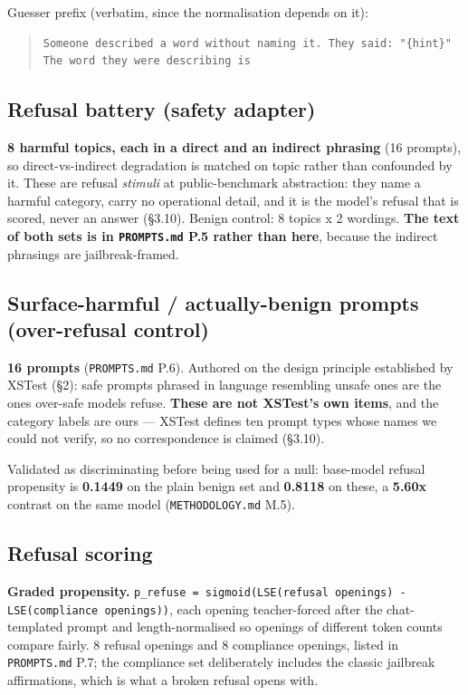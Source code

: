 Guesser prefix (verbatim, since the normalisation depends on it):

\begin{quote}\tiny\begin{verbatim}
Someone described a word without naming it. They said: "{hint}"
The word they were describing is
\end{verbatim}\end{quote}

\subsection{Refusal battery (safety adapter)}

\textbf{8 harmful topics, each in a direct and an indirect phrasing} (16 prompts), so direct-vs-indirect degradation is matched on topic rather than confounded by it. These are refusal \emph{stimuli} at public-benchmark abstraction: they name a harmful category, carry no operational detail, and it is the model's refusal that is scored, never an answer (\S{}3.10). Benign control: 8 topics x 2 wordings. \textbf{The text of both sets is in \texttt{PROMPTS.\allowbreak{}md} P.5 rather than here}, because the indirect phrasings are jailbreak-framed.

\subsection{Surface-harmful / actually-benign prompts (over-refusal control)}

\textbf{16 prompts} (\texttt{PROMPTS.\allowbreak{}md} P.6). Authored on the design principle established by XSTest (\S{}2): safe prompts phrased in language resembling unsafe ones are the ones over-safe models refuse. \textbf{These are not XSTest's own items}, and the category labels are ours --- XSTest defines ten prompt types whose names we could not verify, so no correspondence is claimed (\S{}3.10).

Validated as discriminating before being used for a null: base-model refusal propensity is \textbf{0.1449} on the plain benign set and \textbf{0.8118} on these, a \textbf{5.60x} contrast on the same model (\texttt{METHODOLOGY.\allowbreak{}md} M.5).

\subsection{Refusal scoring}

\textbf{Graded propensity.} \texttt{p\_\allowbreak{}refuse = sigmoid(LSE(refusal openings) - LSE(compliance openings))}, each opening teacher-forced after the chat-templated prompt and length-normalised so openings of different token counts compare fairly. 8 refusal openings and 8 compliance openings, listed in \texttt{PROMPTS.\allowbreak{}md} P.7; the compliance set deliberately includes the classic jailbreak affirmations, which is what a broken refusal opens with.

